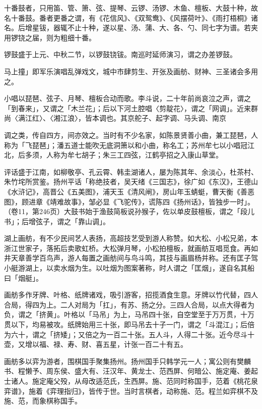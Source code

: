 十番鼓者，只用笛、管、箫、弦、提琴、云锣、汤锣、木鱼、檀板、大鼓十种，故名十番鼓。番者更番之谓，有《花信风》、《双鸳鸯》、《风摆荷叶》、《雨打梧桐》诸名。后增星钹，器辄不止十种，遂以星、汤、蒲、大、各、勺、同七字为谱。若夹用锣铙之届，则为粗细十番。

锣鼓盛于上元、中秋二节，以锣鼓铙钹。南巡时延师演习，谓之办差锣鼓。

马上撞」即军乐演唱乱弹戏文，城中市肆剪生、开张及画舫、财神、三圣诸会多用之。

小唱以琵琶、弦子、月琴、檀板合动而歌。李斗说，二十年前尚哀泣之声，谓之「到春来」，又谓之「木兰花」；后以下河土腔唱〈剪靛花〉，谓之「网调」。近来群尚〈满江红〉、〈湘江浪〉，皆本调也。其京舵子、起字调、马头调、南京


\noindent 调之类，传自四方，间亦效之。当时有不少名家，如陈景贤善小曲，兼工琵琶，人称为「飞琵琶」；潘五道士能吹无底洞箫以和小曲，称名工；苏州牟七以小唱冠江北，后多须，人称为牟七胡子；朱三工四弦，江鹤亭招之入康山草堂。

评话盛于江南，如柳敬亭、孔云霄、韩圭湖诸人，屡为陈其年、余淡心，杜茶村、朱竹垞所赏鉴。扬州平话「称绝技者，吴天绪《三国志》，徐广如《东汉》，王德山《水浒记》，高晋公《五美图》，浦天玉《清风闸》，房山年玉蜻蜓，曹天衡《善恶图》，顾进章《靖难故事》，邹必显《飞驼传》，谎陈四《扬州话》，皆独步一时」。（卷11，第246页）大鼓书始于渔鼓简板说孙猴子，佐以单皮鼓檀板，谓之「段儿书」；后增弦子，谓之「靠山调」。

湖上画舫，有不少民间艺人表扬，高超技艺受到游人称赞。如大松、小松兄弟，本浙江世家子，落拓后卖歌虹桥。大松弹月琴，小松拍檀板，就画舫互唱觅食。再如井天章善学百鸟声，游人每置之画舫间与鸟斗鸣，其技与画眉杨并称。还有匡子驾小艇游湖上，以卖水烟为生。以吐烟为图案著称，时人谓之「匡烟」，遂自名其船曰「烟艇」。

画舫多作牙牌、叶格、纸牌诸戏，吸引游客，招揽酒食生意。牙牌以竹代替，四人合局，得四为上。二人对局为「扛」，有苏、扬之分。三四人合局，以点大得者为负，谓之「挤黄」。叶格以「马吊」为上，马吊四十张，自空堂至于万万贯，十万贯以下，均易被攻。纸牌始用三十张，即马吊去十子一门，谓之「斗混江」；后倍为六十，谓之「挤矮」；又倍之为一百二十张。五人斗，人得二十张。近今尽斗十壶，又增以福、禄、寿、财、喜五星，计张一百二十有五。

画舫多以弈为游者，围棋国手聚集扬州。扬州国手只韩学元一人；寓公则有樊麟书、程懒予、周东侯、盛大有、汪汉年、黄龙士、范西屏、何暗公、施定庵、姜起士诸人。施定庵父殁，从母改适范氏，生西屏。施、范同时称国手，范着《桃花泉弈谱》，施着《弈理指归》，皆传于世。当时言棋者，动称施、范。程兰如弈棋不及施、范，而象棋称国手。


